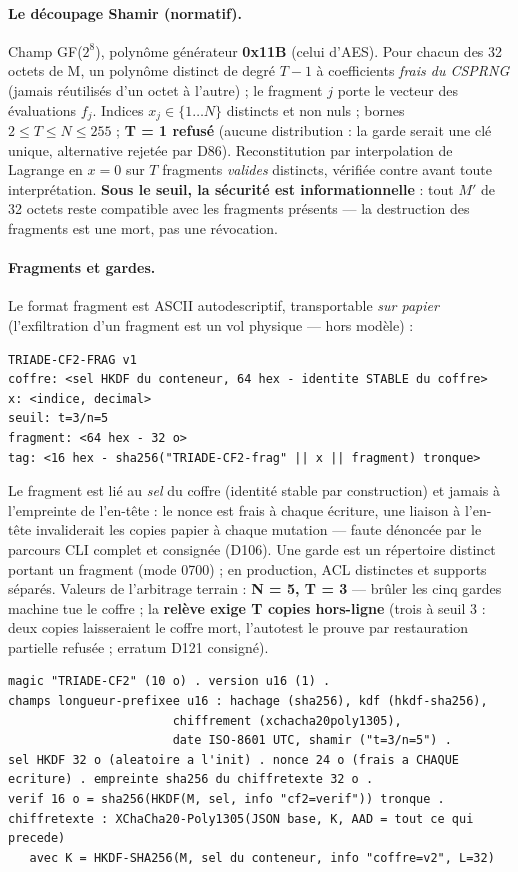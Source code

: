 \paragraph{Le découpage Shamir (normatif).} Champ GF($2^8$), polynôme générateur
\textbf{0x11B} (celui d'AES). Pour chacun des 32 octets de M, un polynôme distinct de
degré $T-1$ à coefficients \emph{frais du CSPRNG} (jamais réutilisés d'un octet à
l'autre) ; le fragment $j$ porte le vecteur des évaluations $f_j$. Indices $x_j \in
\{1 \dots N\}$ distincts et non nuls ; bornes $2 \le T \le N \le 255$ ; \textbf{T = 1
refusé} (aucune distribution : la garde serait une clé unique, alternative rejetée par
D86). Reconstitution par interpolation de Lagrange en $x = 0$ sur $T$ fragments
\emph{valides} distincts, vérifiée contre  avant toute interprétation.
\textbf{Sous le seuil, la sécurité est informationnelle} : tout $M'$ de 32 octets reste
compatible avec les fragments présents — la destruction des fragments est une mort, pas
une révocation.

\paragraph{Fragments et gardes.} Le format fragment est ASCII autodescriptif,
transportable \emph{sur papier} (l'exfiltration d'un fragment est un vol physique — hors
modèle) :

\begin{lstlisting}
TRIADE-CF2-FRAG v1
coffre: <sel HKDF du conteneur, 64 hex - identite STABLE du coffre>
x: <indice, decimal>
seuil: t=3/n=5
fragment: <64 hex - 32 o>
tag: <16 hex - sha256("TRIADE-CF2-frag" || x || fragment) tronque>
\end{lstlisting}

Le fragment est lié au \emph{sel} du coffre (identité stable par construction) et
jamais à l'empreinte de l'en-tête : le nonce est frais à chaque écriture, une liaison à
l'en-tête invaliderait les copies papier à chaque mutation — faute dénoncée par le
parcours CLI complet et consignée (D106). Une garde est un répertoire distinct portant
un fragment (mode 0700) ; en production, ACL distinctes et supports séparés. Valeurs de
l'arbitrage terrain : \textbf{N = 5, T = 3} — brûler les cinq gardes machine tue le
coffre ; la \textbf{relève exige T copies hors-ligne} (trois à seuil 3 : deux copies
laisseraient le coffre mort, l'autotest le prouve par restauration partielle refusée ;
erratum D121 consigné).

\begin{lstlisting}
magic "TRIADE-CF2" (10 o) . version u16 (1) .
champs longueur-prefixee u16 : hachage (sha256), kdf (hkdf-sha256),
                       chiffrement (xchacha20poly1305),
                       date ISO-8601 UTC, shamir ("t=3/n=5") .
sel HKDF 32 o (aleatoire a l'init) . nonce 24 o (frais a CHAQUE
ecriture) . empreinte sha256 du chiffretexte 32 o .
verif 16 o = sha256(HKDF(M, sel, info "cf2=verif")) tronque .
chiffretexte : XChaCha20-Poly1305(JSON base, K, AAD = tout ce qui precede)
   avec K = HKDF-SHA256(M, sel du conteneur, info "coffre=v2", L=32)
\end{lstlisting}

